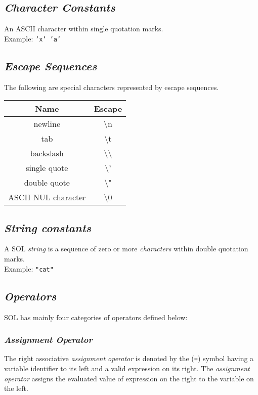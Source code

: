     \subsection{\textit{Character Constants}}
    An ASCII character within single quotation marks.\\
    Example: \texttt{'x' 'a'}

    \subsection{\textit{Escape Sequences}}
    The following are special characters represented by escape sequences.
        \begin{center}
            \begin{tabular}{ |c|c| }
            \hline
                \textbf{Name}   & \textbf{Escape}\\
                \hline
                newline         & \textbackslash n\\
                tab             & \textbackslash t\\
                backslash       & \textbackslash \textbackslash\\
                single quote    & \textbackslash '\\
                double quote    & \textbackslash "\\
                ASCII NUL character & \textbackslash 0\\
            \hline
            \end{tabular}
        \end{center}

    \subsection{\textit{String constants}}
    A SOL \textit{string} is a sequence of zero or more \textit{characters} within double quotation marks.\\
    Example: \texttt{"cat"}

    \subsection{\textit{Operators}}
    SOL has mainly four categories of operators defined below:

        \subsubsection{\textit{Assignment Operator}}
        The right associative \textit{assignment operator} is denoted by the (\texttt{=}) symbol having a variable identifier to its left and a valid expression on its right. The \textit{assignment operator} assigns the evaluated value of expression on the right to the variable on the left.

